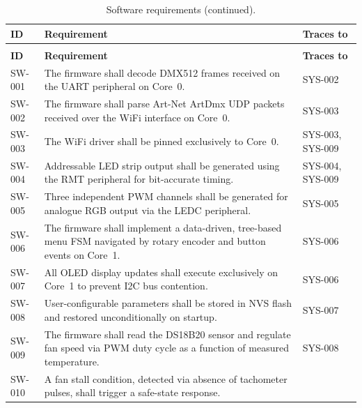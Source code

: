 \begin{longtable}{|p{1.8cm}|p{\dimexpr\linewidth-5.8cm-6\tabcolsep-4\arrayrulewidth\relax}|p{4cm}|}
  \caption{Software requirements derived from system requirements.}\label{tab:req_software} \\
  \hline
  \textbf{ID} & \textbf{Requirement} & \textbf{Traces to} \\ \hline \hline
  \endfirsthead
  \caption[]{Software requirements (continued).} \\
  \hline
  \textbf{ID} & \textbf{Requirement} & \textbf{Traces to} \\ \hline \hline
  \endhead
  \hline
  \endfoot
    \label{req:sw001}SW-001 &
      The firmware shall decode \ac{DMX}512 frames received on the \ac{UART} peripheral on Core~0. &
      SYS-002 \\ \hline
    \label{req:sw002}SW-002 &
      The firmware shall parse Art-Net ArtDmx \ac{UDP} packets received over the \ac{WiFi} interface on Core~0. &
      SYS-003 \\ \hline
    \label{req:sw003}SW-003 &
      The \ac{WiFi} driver shall be pinned exclusively to Core~0. &
      SYS-003, SYS-009 \\ \hline
    \label{req:sw004}SW-004 &
      Addressable \ac{LED} strip output shall be generated using the \ac{RMT} peripheral for bit-accurate timing. &
      SYS-004, SYS-009 \\ \hline
    \label{req:sw005}SW-005 &
      Three independent \ac{PWM} channels shall be generated for analogue \ac{RGB} output via the LEDC peripheral. &
      SYS-005 \\ \hline
    \label{req:sw006}SW-006 &
      The firmware shall implement a data-driven, tree-based menu \ac{FSM} navigated by rotary encoder and button events on Core~1. &
      SYS-006 \\ \hline
    \label{req:sw007}SW-007 &
      All \ac{OLED} display updates shall execute exclusively on Core~1 to prevent \ac{I2C} bus contention. &
      SYS-006 \\ \hline
    \label{req:sw008}SW-008 &
      User-configurable parameters shall be stored in \ac{NVS} flash and restored unconditionally on startup. &
      SYS-007 \\ \hline
    \label{req:sw009}SW-009 &
      The firmware shall read the DS18B20 sensor and regulate fan speed via \ac{PWM} duty cycle as a function of measured temperature. &
      SYS-008 \\ \hline
    \label{req:sw010}SW-010 &
      A fan stall condition, detected via absence of tachometer pulses, shall trigger a safe-state response. &

\end{longtable}
